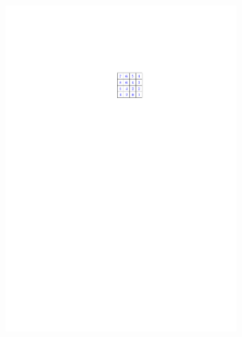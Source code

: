 \documentclass[letterpaper]{article}
\theoremstyle{definition}
\begin{document}
\begin{figure}[t]
\begin{subfigure}[b]{0.12\textwidth}
	\includegraphics[width=0.95\textwidth]{Figs/example1_a2_h_EG.pdf}
    \caption{}
  \end{subfigure}
  \begin{subfigure}[b]{0.12\textwidth}
    \centering

\end{subfigure}
\end{figure}
\end{document}
